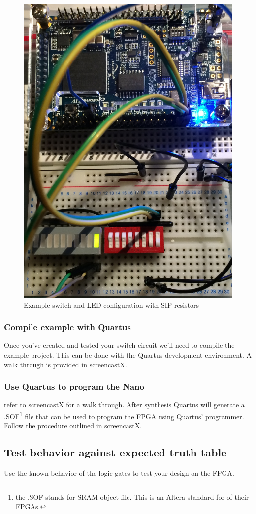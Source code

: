 \documentclass[12pt,journal]{IEEEtran}
\begin{document}
        \begin{figure}[H]
          \includegraphics[width=.48\textwidth]{Images/ExampleLayout.jpg}
          \caption{Example switch and LED configuration with SIP resistors}
        \end{figure}

      \subsubsection{Compile example with Quartus}
        Once you've created and tested your switch circuit we'll need to compile the example project. This can be done
        with the Quartus development environment. A walk through is provided in screencastX. 

      \subsubsection{Use Quartus to program the Nano} refer to screencastX for a walk through. After synthesis
      Quartus will generate a .SOF\footnote{the .SOF stands for SRAM object file. This is an Altera standard for
      of their FPGAs.} file that can be used to program the FPGA using Quartus' programmer. Follow the procedure
      outlined in screencastX.
        
      \subsection{Test behavior against expected truth table} 
      Use the known behavior of the logic gates to test your design on the FPGA. 
\end{document}
